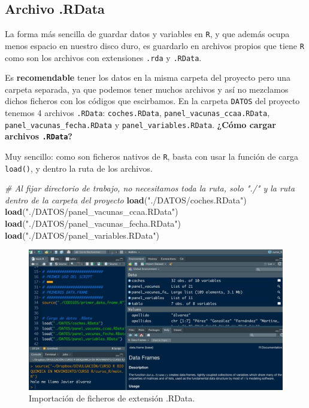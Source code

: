 \documentclass[11pt,]{book}
\newenvironment{Shaded}{\begin{snugshade}}{\end{snugshade}}
\newcommand{\CommentTok}[1]{\textcolor[rgb]{0.37,0.37,0.37}{\textit{#1}}}
\newcommand{\KeywordTok}[1]{\textcolor[rgb]{0.27,0.27,0.27}{\textbf{#1}}}
\newcommand{\NormalTok}[1]{#1}
\newcommand{\StringTok}[1]{\textcolor[rgb]{0.5,0.5,0.5}{#1}}
\begin{document}
\hypertarget{archivo-.rdata}{%
\subsection{Archivo .RData}\label{archivo-.rdata}}

La forma más sencilla de guardar datos y variables en \texttt{R}, y que además ocupa menos espacio en nuestro disco duro, es guardarlo en archivos propios que tiene \texttt{R} como son los archivos con extensiones \texttt{.rda} y \texttt{.RData}.

Es \textbf{recomendable} tener los datos en la misma carpeta del proyecto pero una carpeta separada, ya que podemos tener muchos archivos y así no mezclamos dichos ficheros con los códigos que escirbamos. En la carpeta \texttt{DATOS} del proyecto tenemos 4 archivos \texttt{.RData}: \texttt{coches.RData}, \texttt{panel\_vacunas\_ccaa.RData}, \texttt{panel\_vacunas\_fecha.RData} y \texttt{panel\_variables.RData}. \textbf{¿Cómo cargar archivos \texttt{.RData}?}

Muy sencillo: como son ficheros nativos de \texttt{R}, basta con usar la función de carga \texttt{load()}, y dentro la ruta de los archivos.

\begin{Shaded}
\begin{Highlighting}[]
\CommentTok{# Al fijar directorio de trabajo, no necesitamos toda la ruta, solo "./" y la ruta dentro de la carpeta del proyecto}
\KeywordTok{load}\NormalTok{(}\StringTok{"./DATOS/coches.RData"}\NormalTok{) }
\KeywordTok{load}\NormalTok{(}\StringTok{"./DATOS/panel_vacunas_ccaa.RData"}\NormalTok{)}
\KeywordTok{load}\NormalTok{(}\StringTok{"./DATOS/panel_vacunas_fecha.RData"}\NormalTok{)}
\KeywordTok{load}\NormalTok{(}\StringTok{"./DATOS/panel_variables.RData"}\NormalTok{)}
\end{Highlighting}
\end{Shaded}

\begin{figure}

{\centering \includegraphics[width=0.5\linewidth]{./img/carga_RDATA} 

}

\caption{Importación de ficheros de extensión .RData.}\label{fig:carga-RDATA}
\end{figure}
\end{document}
